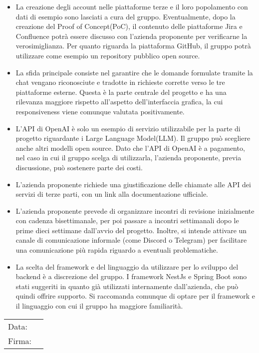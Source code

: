 \documentclass[a4paper, 12pt]{article}
\begin{document}
\begin{itemize}
    \item La creazione degli account nelle piattaforme terze e il loro popolamento con dati di esempio sono lasciati a cura del gruppo. Eventualmente, dopo la creazione del Proof of Concept(PoC), il contenuto delle piattaforme Jira e Confluence potrà essere discusso con l'azienda proponente per verificarne la verosimiglianza. Per quanto riguarda la piattaforma GitHub, il gruppo potrà utilizzare come esempio un repository pubblico open source. 

    \item La sfida principale consiste nel garantire che le domande formulate tramite la chat vengano riconosciute e tradotte in richieste corrette verso le tre piattaforme esterne. Questa è la parte centrale del progetto e ha una rilevanza maggiore rispetto all'aspetto dell'interfaccia grafica, la cui responsiveness viene comunque valutata positivamente.

    \item L'API di OpenAI è solo un esempio di servizio utilizzabile per la parte di progetto riguardante i Large Language Model(LLM). Il gruppo può scegliere anche altri modelli open source. Dato che l'API di OpenAI è a pagamento, nel caso in cui il gruppo scelga di utilizzarla, l'azienda proponente, previa discussione, può sostenere parte dei costi. 

    \item L'azienda proponente richiede una giustificazione delle chiamate alle API dei servizi di terze parti, con un link alla documentazione ufficiale. 

    \item L'azienda proponente prevede di organizzare incontri di revisione inizialmente con cadenza bisettimanale, per poi passare a incontri settimanali dopo le prime dieci settimane dall'avvio del progetto. Inoltre, si intende attivare un canale di comunicazione informale (come Discord o Telegram) per facilitare una comunicazione più rapida riguardo a eventuali problematiche.

    \item La scelta del framework e del linguaggio da utilizzare per lo sviluppo del backend è a discrezione del gruppo. I framework NestJs e Spring Boot sono stati suggeriti in quanto già utilizzati internamente dall'azienda, che può quindi offrire supporto. Si raccomanda comunque di optare per il framework e il linguaggio con cui il gruppo ha maggiore familiarità.
\end{itemize}

\vfill
{\renewcommand{\arraystretch}{2}
\begin{tabular}{l p{5cm}}
    Data: &  \hrulefill \\
    Firma: & \hrulefill \\
\end{tabular}
}
\end{document}
